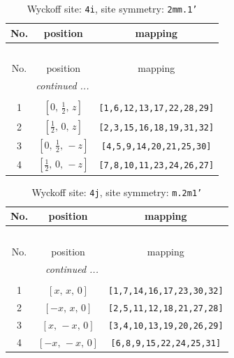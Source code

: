 \documentclass[fleqn,8pt]{jsarticle}
\begin{document}
\begin{longtable}{ccc}
\caption{Wyckoff site: {\tt 4i}, site symmetry: {\tt 2mm.1'}}
 \\
 \hline \hline
No. & position & mapping \\ \hline \endfirsthead

\multicolumn{2}{l}{\tablename\ \thetable{}} \\
 \hline \hline
No. & position & mapping \\ \hline \endhead

 \hline \hline
\multicolumn{2}{r}{\footnotesize\it continued ...} \\ \endfoot

 \hline \hline
\multicolumn{2}{r}{} \\ \endlastfoot

1 & $\left[ 0,\, \frac{1}{2},\, z \right]$ & {\tt [1,6,12,13,17,22,28,29]} \\ \hline
2 & $\left[ \frac{1}{2},\, 0,\, z \right]$ & {\tt [2,3,15,16,18,19,31,32]} \\ \hline
3 & $\left[ 0,\, \frac{1}{2},\, - z \right]$ & {\tt [4,5,9,14,20,21,25,30]} \\ \hline
4 & $\left[ \frac{1}{2},\, 0,\, - z \right]$ & {\tt [7,8,10,11,23,24,26,27]} \\
\end{longtable}
\renewcommand{\arraystretch}{1.2}
\begin{longtable}{ccc}
\caption{Wyckoff site: {\tt 4j}, site symmetry: {\tt m.2m1'}}
 \\
 \hline \hline
No. & position & mapping \\ \hline \endfirsthead

\multicolumn{2}{l}{\tablename\ \thetable{}} \\
 \hline \hline
No. & position & mapping \\ \hline \endhead

 \hline \hline
\multicolumn{2}{r}{\footnotesize\it continued ...} \\ \endfoot

 \hline \hline
\multicolumn{2}{r}{} \\ \endlastfoot

1 & $\left[ x,\, x,\, 0 \right]$ & {\tt [1,7,14,16,17,23,30,32]} \\ \hline
2 & $\left[ - x,\, x,\, 0 \right]$ & {\tt [2,5,11,12,18,21,27,28]} \\ \hline
3 & $\left[ x,\, - x,\, 0 \right]$ & {\tt [3,4,10,13,19,20,26,29]} \\ \hline
4 & $\left[ - x,\, - x,\, 0 \right]$ & {\tt [6,8,9,15,22,24,25,31]} \\
\end{longtable}
\end{document}
